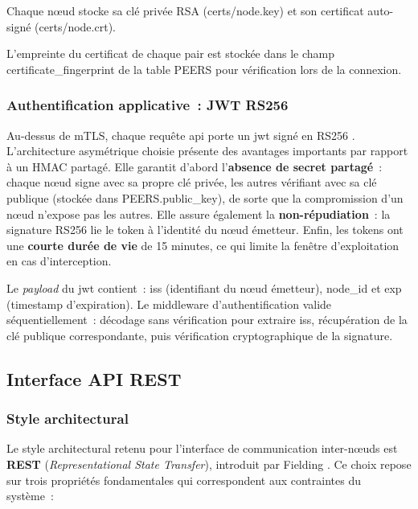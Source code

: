 Chaque nœud stocke sa clé privée RSA ({certs/node.key}) et son certificat auto-signé ({certs/node.crt}).

L'empreinte du certificat de chaque pair est stockée dans le champ {certificate\_fingerprint} de la table {PEERS} pour vérification lors de la connexion.

\subsubsection{Authentification applicative~: JWT RS256}

Au-dessus de mTLS, chaque requête \gls{api} porte un \gls{jwt} \parencite{rfc7519jwt} signé en RS256 \parencite{rfc7518jwa}. L'architecture asymétrique choisie présente des avantages importants par rapport à un HMAC partagé. Elle garantit d'abord l'\textbf{absence de secret partagé}~: chaque nœud signe avec sa propre clé privée, les autres vérifiant avec sa clé publique (stockée dans {PEERS.public\_key}), de sorte que la compromission d'un nœud n'expose pas les autres. Elle assure également la \textbf{non-répudiation}~: la signature RS256 lie le token à l'identité du nœud émetteur. Enfin, les tokens ont une \textbf{courte durée de vie} de 15 minutes, ce qui limite la fenêtre d'exploitation en cas d'interception.

Le \textit{payload} du \gls{jwt} contient~: {iss} (identifiant du nœud émetteur), {node\_id} et {exp} (timestamp d'expiration). Le middleware d'authentification valide séquentiellement~: décodage sans vérification pour extraire {iss}, récupération de la clé publique correspondante, puis vérification cryptographique de la signature.


\subsection{Interface API REST}
\label{sec:api}

\subsubsection{Style architectural}

Le style architectural retenu pour l'interface de communication inter-nœuds est \textbf{REST} (\textit{Representational State Transfer}), introduit par Fielding \parencite{fielding2000rest}. Ce choix repose sur trois propriétés fondamentales qui correspondent aux contraintes du système~:

